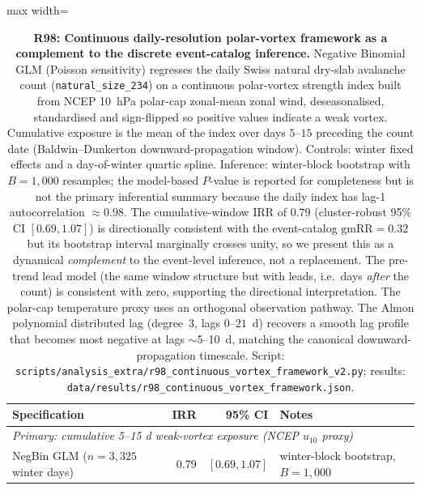 \documentclass[11pt,letterpaper]{article}
\begin{document}
\begin{table}[!h]
\centering
\small
\caption{\textbf{R98: Continuous daily-resolution polar-vortex framework as a complement to the discrete event-catalog inference.} Negative Binomial GLM (Poisson sensitivity) regresses the daily Swiss natural dry-slab avalanche count (\texttt{natural\_size\_234}) on a continuous polar-vortex strength index built from NCEP 10~hPa polar-cap zonal-mean zonal wind, deseasonalised, standardised and sign-flipped so positive values indicate a weak vortex. Cumulative exposure is the mean of the index over days $5$--$15$ preceding the count date (Baldwin--Dunkerton downward-propagation window). Controls: winter fixed effects and a day-of-winter quartic spline. Inference: winter-block bootstrap with $B = 1{,}000$ resamples; the model-based $P$-value is reported for completeness but is not the primary inferential summary because the daily index has lag-1 autocorrelation $\approx 0.98$. The cumulative-window IRR of $0.79$ (cluster-robust 95\% CI $[0.69, 1.07]$) is directionally consistent with the event-catalog $\mathrm{gmRR} = 0.32$ but its bootstrap interval marginally crosses unity, so we present this as a dynamical \emph{complement} to the event-level inference, not a replacement. The pre-trend lead model (the same window structure but with leads, i.e.\ days \emph{after} the count) is consistent with zero, supporting the directional interpretation. The polar-cap temperature proxy uses an orthogonal observation pathway. The Almon polynomial distributed lag (degree~3, lags $0$--$21$~d) recovers a smooth lag profile that becomes most negative at lags $\sim$5--10~d, matching the canonical downward-propagation timescale. Script: \texttt{scripts/analysis\_extra/r98\_continuous\_vortex\_framework\_v2.py}; results: \texttt{data/results/r98\_continuous\_vortex\_framework.json}.}
\label{tab:r98_continuous_vortex}
\begin{adjustbox}{max width=\textwidth}
\begin{tabular}{lrrl}
\toprule
\textbf{Specification} & \textbf{IRR} & \textbf{95\% CI} & \textbf{Notes} \\
\midrule
\multicolumn{4}{l}{\emph{Primary: cumulative 5--15 d weak-vortex exposure (NCEP $u_{10}$ proxy)}} \\
NegBin GLM ($n = 3{,}325$ winter days) & 0.79 & $[0.69, 1.07]$ & winter-block bootstrap, $B = 1{,}000$ \\

\end{tabular}
\end{adjustbox}
\end{table}
\end{document}
